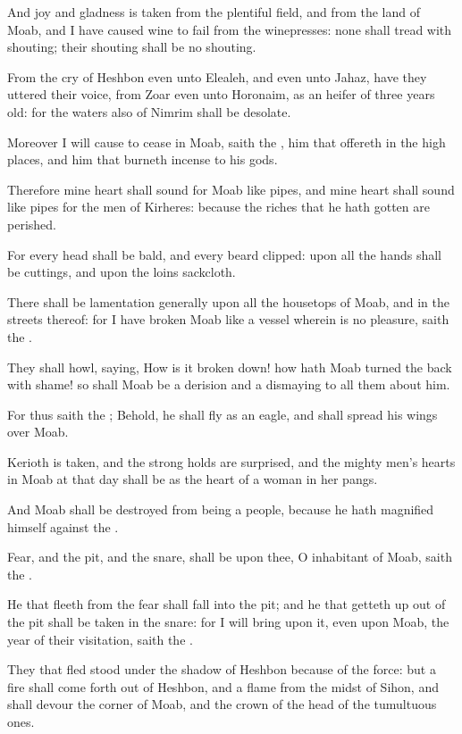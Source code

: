 \Verse And joy and gladness is taken from the plentiful field, and from the land of Moab, and I have caused wine to fail from the winepresses: none shall tread with shouting; their shouting shall be no shouting.

\Verse From the cry of Heshbon even unto Elealeh, and even unto Jahaz, have they uttered their voice, from Zoar even unto Horonaim, as an heifer of three years old: for the waters also of Nimrim shall be desolate.

\Verse Moreover I will cause to cease in Moab, saith the \LORD, him that offereth in the high places, and him that burneth incense to his gods.

\Verse Therefore mine heart shall sound for Moab like pipes, and mine heart shall sound like pipes for the men of Kirheres: because the riches that he hath gotten are perished.

\Verse For every head shall be bald, and every beard clipped: upon all the hands shall be cuttings, and upon the loins sackcloth.

\Verse There shall be lamentation generally upon all the housetops of Moab, and in the streets thereof: for I have broken Moab like a vessel wherein is no pleasure, saith the \LORD.

\Verse They shall howl, saying, How is it broken down! how hath Moab turned the back with shame! so shall Moab be a derision and a dismaying to all them about him.

\Verse For thus saith the \LORD; Behold, he shall fly as an eagle, and shall spread his wings over Moab.

\Verse Kerioth is taken, and the strong holds are surprised, and the mighty men's hearts in Moab at that day shall be as the heart of a woman in her pangs.

\Verse And Moab shall be destroyed from being a people, because he hath magnified himself against the \LORD.

\Verse Fear, and the pit, and the snare, shall be upon thee, O inhabitant of Moab, saith the \LORD.

\Verse He that fleeth from the fear shall fall into the pit; and he that getteth up out of the pit shall be taken in the snare: for I will bring upon it, even upon Moab, the year of their visitation, saith the \LORD.

\Verse They that fled stood under the shadow of Heshbon because of the force: but a fire shall come forth out of Heshbon, and a flame from the midst of Sihon, and shall devour the corner of Moab, and the crown of the head of the tumultuous ones.

